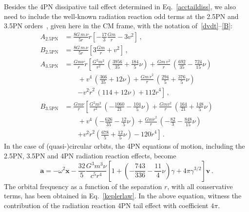 \documentclass[prd,preprint,superscriptaddress,tightenlines,nofootinbib,
  eqsecnum,showpacs]{revtex4}
\begin{document}
Besides the 4PN dissipative tail effect determined in Eq.~\eqref{acctaildiss},
we also need to include the well-known radiation reaction odd terms at the 2.5PN
and 3.5PN orders~\cite{IW93, IW95, PW02, KFS03, NB05, itoh3}, given here in
the CM frame, with the notation of~\eqref{dvdt}--\eqref{B}:
%
\begin{subequations}\label{ABdiss}
\begin{align}
A_\text{2.5PN} &= \frac{8
  G\,m\,\nu}{5r}\dot{r}\left[-\frac{17}{3} \frac{G m}{r} - 3
  v^2\right]\,,\\
B_\text{2.5PN} &= \frac{8 G\,m\,\nu}{5r}\left[ 3\frac{G
    m}{r} + v^2\right]\,,\\
A_\text{3.5PN} &= \frac{G m \nu}{r} \dot{r}\left[\frac{G^2
    m^2}{r^2} \, \left( \frac{3956}{35} + \frac{184}{5} \nu \right) +
  \frac{G m \,v^2}{r} \, \left( \frac{692}{35} - \frac{724}{15} \nu
  \right)\right. \nonumber\\ & \quad\quad + v^4 \, \left(
  \frac{366}{35} + 12 \nu \right) + \frac{G m \,\dot{r}^2}{r} \, \left(
  \frac{294}{5} + \frac{376}{5} \nu \right) \nonumber\\ &
  \quad\quad\left. - v^2 \dot{r}^2 \, \left( 114 + 12 \nu \right) + 112
  \dot{r}^4 \right]\,,\\
B_\text{3.5PN} &= \frac{G m \nu}{r}\left[\frac{G^2
    m^2}{r^2} \, \left( - \frac{1060}{21} - \frac{104}{5}\nu \right) +
  \frac{G m v^2}{r} \, \left( \frac{164}{21} + \frac{148}{5} \nu
  \right) \right. \nonumber\\ & \quad\quad + v^4\, \left(
  - \frac{626}{35} - \frac{12}{5} \nu \right) + \frac{G m \dot{r}^2}{r} \,
  \left( - \frac{82}{3} - \frac{848}{15} \nu \right) \nonumber\\ &
  \quad\quad\left. + v^2 \dot{r}^2 \left( \frac{678}{5} +
  \frac{12}{5} \nu \right) - 120 \dot{r}^4 \right]\,.
\end{align}\end{subequations}
%
In the case of (quasi-)circular orbits, the 4PN equations of motion, including
the 2.5PN, 3.5PN and 4PN radiation reaction effects, become
%
\begin{equation}\label{eomcirc}
\bm{a} = -\omega^2 \bm{x} - \frac{32}{5}\frac{G^3m^3\nu}{c^5r^4}\left[1 +
  \left(-\frac{743}{336} - \frac{11}{4}\nu\right)\gamma + 4\pi
  \gamma^{3/2} \right] \bm{v} \,.
\end{equation}
%
The orbital frequency as a function of the separation $r$, with all
conservative terms, has been obtained in Eq.~\eqref{keplerlaw}. In the above
equation, witness the contribution of the radiation reaction 4PN tail effect
with coefficient $4\pi$.
\end{document}
